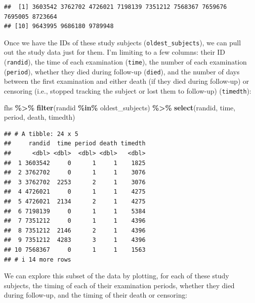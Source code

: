 \documentclass[
]{book}
\newenvironment{Shaded}{\begin{snugshade}}{\end{snugshade}}
\newcommand{\FunctionTok}[1]{\textcolor[rgb]{0.13,0.29,0.53}{\textbf{#1}}}
\newcommand{\NormalTok}[1]{#1}
\newcommand{\SpecialCharTok}[1]{\textcolor[rgb]{0.81,0.36,0.00}{\textbf{#1}}}
\begin{document}
\begin{verbatim}
##  [1] 3603542 3762702 4726021 7198139 7351212 7568367 7659676 7695005 8723664
## [10] 9643995 9686180 9789948
\end{verbatim}

Once we have the IDs of these study subjects (\texttt{oldest\_subjects}), we can pull out the study data just for them. I'm limiting to a few columns: their ID (\texttt{randid}), the time of each examination (\texttt{time}), the number of each examination (\texttt{period}), whether they died during follow-up (\texttt{died}), and the number of days between the first examination and either death (if they died during follow-up) or censoring (i.e., stopped tracking the subject or lost them to follow-up) (\texttt{timedth}):

\begin{Shaded}
\begin{Highlighting}[]
\NormalTok{fhs }\SpecialCharTok{\%\textgreater{}\%} 
  \FunctionTok{filter}\NormalTok{(randid }\SpecialCharTok{\%in\%}\NormalTok{ oldest\_subjects) }\SpecialCharTok{\%\textgreater{}\%} 
  \FunctionTok{select}\NormalTok{(randid, time, period, death, timedth)}
\end{Highlighting}
\end{Shaded}

\begin{verbatim}
## # A tibble: 24 x 5
##     randid  time period death timedth
##      <dbl> <dbl>  <dbl> <dbl>   <dbl>
##  1 3603542     0      1     1    1825
##  2 3762702     0      1     1    3076
##  3 3762702  2253      2     1    3076
##  4 4726021     0      1     1    4275
##  5 4726021  2134      2     1    4275
##  6 7198139     0      1     1    5384
##  7 7351212     0      1     1    4396
##  8 7351212  2146      2     1    4396
##  9 7351212  4283      3     1    4396
## 10 7568367     0      1     1    1563
## # i 14 more rows
\end{verbatim}

We can explore this subset of the data by plotting, for each of these study subjects, the timing of each of their examination periods, whether they died during follow-up, and the timing of their death or censoring:
\end{document}
